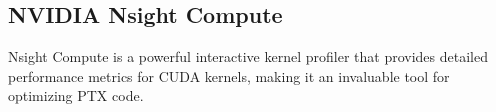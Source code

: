 \subsection{NVIDIA Nsight Compute}

Nsight Compute is a powerful interactive kernel profiler that provides detailed performance metrics for CUDA kernels, making it an invaluable tool for optimizing PTX code.

